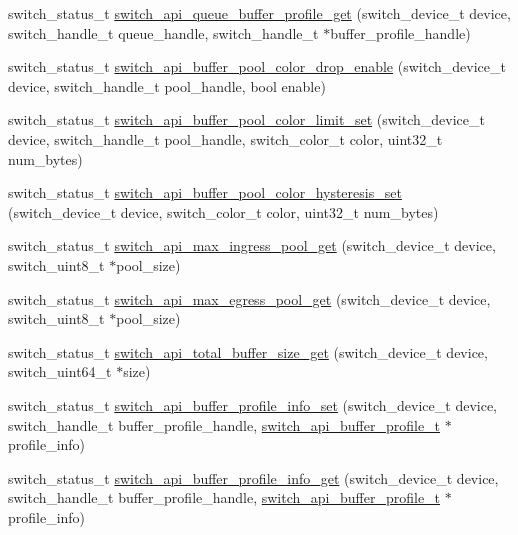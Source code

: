 \begin{DoxyCompactItemize}
\item 
switch\+\_\+status\+\_\+t \hyperlink{group__Buffer_ga1eba393b0b337d2e7b334613fa9c44ab}{switch\+\_\+api\+\_\+queue\+\_\+buffer\+\_\+profile\+\_\+get} (switch\+\_\+device\+\_\+t device, switch\+\_\+handle\+\_\+t queue\+\_\+handle, switch\+\_\+handle\+\_\+t $\ast$buffer\+\_\+profile\+\_\+handle)
\item 
switch\+\_\+status\+\_\+t \hyperlink{group__Buffer_ga1cfe444d6ee18d1b351d60b00d2ce85d}{switch\+\_\+api\+\_\+buffer\+\_\+pool\+\_\+color\+\_\+drop\+\_\+enable} (switch\+\_\+device\+\_\+t device, switch\+\_\+handle\+\_\+t pool\+\_\+handle, bool enable)
\item 
switch\+\_\+status\+\_\+t \hyperlink{group__Buffer_gaa6ca610c15ba04e89d343245ae90306d}{switch\+\_\+api\+\_\+buffer\+\_\+pool\+\_\+color\+\_\+limit\+\_\+set} (switch\+\_\+device\+\_\+t device, switch\+\_\+handle\+\_\+t pool\+\_\+handle, switch\+\_\+color\+\_\+t color, uint32\+\_\+t num\+\_\+bytes)
\item 
switch\+\_\+status\+\_\+t \hyperlink{group__Buffer_gab6fd15e2ad55bef489a519f0a55932d3}{switch\+\_\+api\+\_\+buffer\+\_\+pool\+\_\+color\+\_\+hysteresis\+\_\+set} (switch\+\_\+device\+\_\+t device, switch\+\_\+color\+\_\+t color, uint32\+\_\+t num\+\_\+bytes)
\item 
switch\+\_\+status\+\_\+t \hyperlink{group__Buffer_ga4c85d4480de2b2e0dedb6468cbef2141}{switch\+\_\+api\+\_\+max\+\_\+ingress\+\_\+pool\+\_\+get} (switch\+\_\+device\+\_\+t device, switch\+\_\+uint8\+\_\+t $\ast$pool\+\_\+size)
\item 
switch\+\_\+status\+\_\+t \hyperlink{group__Buffer_ga822419c34a1c530d4a9af58c223fc2c7}{switch\+\_\+api\+\_\+max\+\_\+egress\+\_\+pool\+\_\+get} (switch\+\_\+device\+\_\+t device, switch\+\_\+uint8\+\_\+t $\ast$pool\+\_\+size)
\item 
switch\+\_\+status\+\_\+t \hyperlink{group__Buffer_ga508b0fcade7614f99c8f74825ccc3ac7}{switch\+\_\+api\+\_\+total\+\_\+buffer\+\_\+size\+\_\+get} (switch\+\_\+device\+\_\+t device, switch\+\_\+uint64\+\_\+t $\ast$size)
\item 
switch\+\_\+status\+\_\+t \hyperlink{group__Buffer_ga1180c1140eadcdabe7bb84312a8b2f22}{switch\+\_\+api\+\_\+buffer\+\_\+profile\+\_\+info\+\_\+set} (switch\+\_\+device\+\_\+t device, switch\+\_\+handle\+\_\+t buffer\+\_\+profile\+\_\+handle, \hyperlink{group__Buffer_ga4d903bc1adf700cb1f2c3313c953e059}{switch\+\_\+api\+\_\+buffer\+\_\+profile\+\_\+t} $\ast$profile\+\_\+info)
\item 
switch\+\_\+status\+\_\+t \hyperlink{group__Buffer_ga2c60f1edce6ff9a8d52165705b2dfeab}{switch\+\_\+api\+\_\+buffer\+\_\+profile\+\_\+info\+\_\+get} (switch\+\_\+device\+\_\+t device, switch\+\_\+handle\+\_\+t buffer\+\_\+profile\+\_\+handle, \hyperlink{group__Buffer_ga4d903bc1adf700cb1f2c3313c953e059}{switch\+\_\+api\+\_\+buffer\+\_\+profile\+\_\+t} $\ast$profile\+\_\+info)

\end{DoxyCompactItemize}
